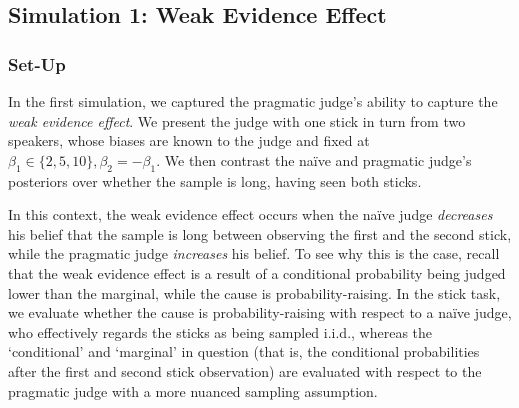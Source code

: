 \documentclass[10pt,letterpaper]{article}
\begin{document}
\subsection{Simulation 1: Weak Evidence Effect}

\subsubsection{Set-Up}
In the first simulation, we captured the pragmatic judge's ability to capture the \textit{weak evidence effect}. We 
present the judge with one stick in turn from two speakers, whose biases are known to the judge and fixed at
$\beta_1 \in \{2, 5, 10\}, \beta_2 = -\beta_1$. We then contrast the na\"ive and pragmatic judge's posteriors over whether the
sample is long, having seen both sticks.

In this context, the weak evidence effect occurs when the na\"ive judge \textit{decreases} his belief that the sample is
long between observing the first and the second stick, while the pragmatic judge \textit{increases} his belief. To see
why this is the case, recall that the weak evidence effect is a result of a conditional probability being judged lower than the 
marginal, while the cause is probability-raising. In the stick task, we evaluate whether the cause is probability-raising with
respect to a na\"ive judge, who effectively regards the sticks as being sampled i.i.d., whereas the `conditional' and `marginal' in question
(that is, the conditional probabilities after the first and second stick observation) are evaluated with respect to the pragmatic 
judge with a more nuanced sampling assumption.
\end{document}
